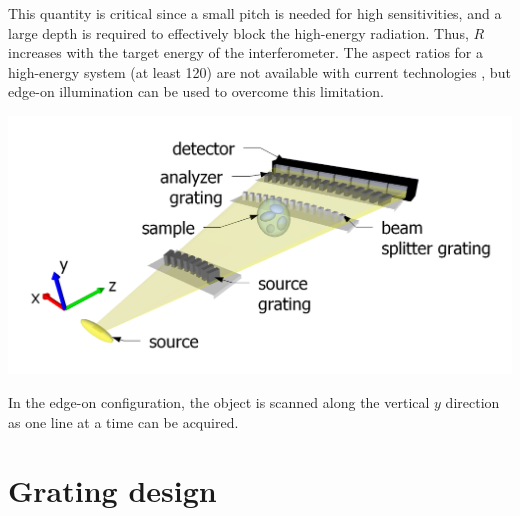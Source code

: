 \documentclass[a0,portrait]{a0poster}
\newenvironment{spacedcenter}{
    \vspace{2cm}\begin{center}}
        {\end{center}
    \vspace{2cm}\par}
\begin{document}
\begin{multicols}{2}
This quantity is critical since a small pitch is needed for high
sensitivities, and a large depth is required to effectively block the
high-energy radiation. Thus, $R$ increases with the target energy of the
interferometer.
%
The aspect ratios for a high-energy system (at least \num{120}) are not available with current
technologies \cite{David2007}, but edge-on illumination can be used to overcome this
limitation.
\begin{spacedcenter}
    \includegraphics[width=0.8\linewidth]{hDPC_setup.png}
\end{spacedcenter}
In the edge-on configuration, the object is scanned along the vertical
$y$ direction as one line at a time can be acquired.  


\section*{Grating design}


\end{multicols}
\end{document}
